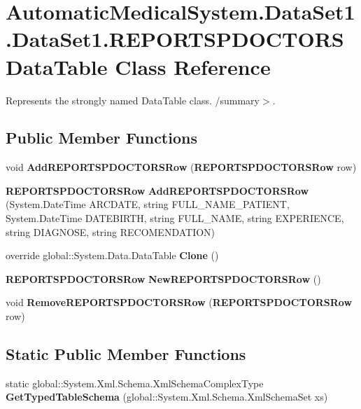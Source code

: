 \section{AutomaticMedicalSystem.DataSet1.DataSet1.REPORTSPDOCTORSDataTable Class Reference}
\label{class_automatic_medical_system_1_1_data_set1_1_1_r_e_p_o_r_t_s_p_d_o_c_t_o_r_s_data_table}
Represents the strongly named DataTable class. /summary$>$.  


\subsection*{Public Member Functions}
\begin{CompactItemize}
\item 
void \textbf{AddREPORTSPDOCTORSRow} ({\bf REPORTSPDOCTORSRow} row)\label{class_automatic_medical_system_1_1_data_set1_1_1_r_e_p_o_r_t_s_p_d_o_c_t_o_r_s_data_table_20d9be49544ede168494bac1b8171361}

\item 
{\bf REPORTSPDOCTORSRow} \textbf{AddREPORTSPDOCTORSRow} (System.DateTime ARCDATE, string FULL\_\-NAME\_\-PATIENT, System.DateTime DATEBIRTH, string FULL\_\-NAME, string EXPERIENCE, string DIAGNOSE, string RECOMENDATION)\label{class_automatic_medical_system_1_1_data_set1_1_1_r_e_p_o_r_t_s_p_d_o_c_t_o_r_s_data_table_2bfb5950653750420099b7b0779a2f1b}

\item 
override global::System.Data.DataTable \textbf{Clone} ()\label{class_automatic_medical_system_1_1_data_set1_1_1_r_e_p_o_r_t_s_p_d_o_c_t_o_r_s_data_table_ffe1828c0a5c751c63d6088118b16998}

\item 
{\bf REPORTSPDOCTORSRow} \textbf{NewREPORTSPDOCTORSRow} ()\label{class_automatic_medical_system_1_1_data_set1_1_1_r_e_p_o_r_t_s_p_d_o_c_t_o_r_s_data_table_bb18bfe922a947db6e65d30aaa66c5e2}

\item 
void \textbf{RemoveREPORTSPDOCTORSRow} ({\bf REPORTSPDOCTORSRow} row)\label{class_automatic_medical_system_1_1_data_set1_1_1_r_e_p_o_r_t_s_p_d_o_c_t_o_r_s_data_table_b9ebaf9e7130fcb2fef0f94961e9c781}

\end{CompactItemize}
\subsection*{Static Public Member Functions}
\begin{CompactItemize}
\item 
static global::System.Xml.Schema.XmlSchemaComplexType \textbf{GetTypedTableSchema} (global::System.Xml.Schema.XmlSchemaSet xs)\label{class_automatic_medical_system_1_1_data_set1_1_1_r_e_p_o_r_t_s_p_d_o_c_t_o_r_s_data_table_13967aeb7cebb7b353ba937d4ba88935}

\end{CompactItemize}
